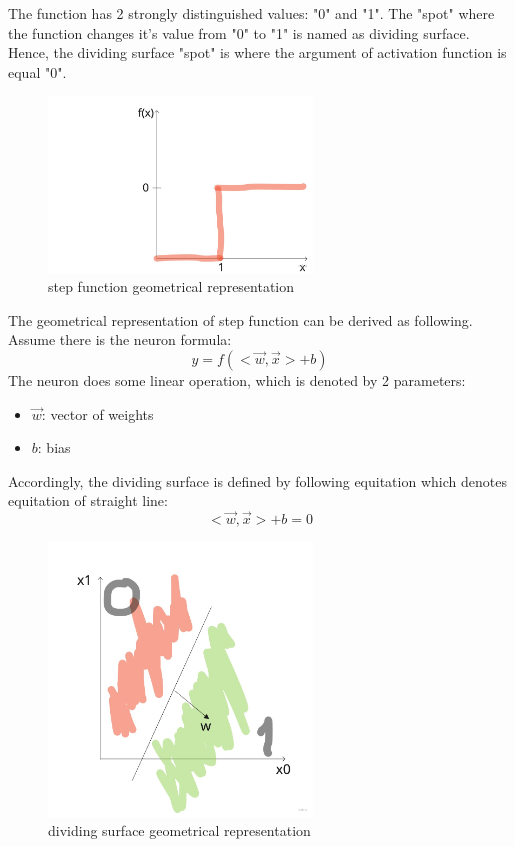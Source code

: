 The function has 2 strongly distinguished values: "0" and "1". The "spot" where the function changes it's value from "0" to "1" is named as dividing surface. Hence, the dividing surface "spot" is where the argument of activation function is equal "0".

\begin{figure}[h]
    \centering \includegraphics[width=7cm]{images/step_function.jpg}
    \caption {step function geometrical representation}
\end{figure}

The geometrical representation of step function can be derived as following. Assume there is the neuron formula:
\[ y = f(<\overrightarrow{w}, \overrightarrow{x}>+b) \]
The neuron does some linear operation, which is denoted by 2 parameters:
\begin{itemize}
    \item $\overrightarrow{w}$: vector of weights
    \item $b$: bias
\end{itemize}
Accordingly, the dividing surface is defined by following equitation which denotes equitation of straight line:
\[<\overrightarrow{w}, \overrightarrow{x}>+b = 0 \]

\begin{figure}[h]
    \centering \includegraphics[width=7cm]{images/dividing_surface.jpg}
    \caption {dividing surface geometrical representation}
\end{figure}


